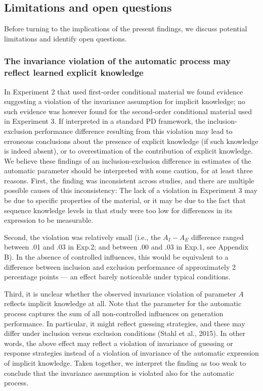 \documentclass[man]{apa6}
\theoremstyle{definition}
\theoremstyle{definition}
\theoremstyle{definition}
\theoremstyle{remark}
\begin{document}
\subsection{Limitations and open
questions}\label{limitations-and-open-questions}

Before turning to the implications of the present findings, we discuss
potential limitations and identify open questions.

\subsubsection{The invariance violation of the automatic process may
reflect learned explicit
knowledge}\label{the-invariance-violation-of-the-automatic-process-may-reflect-learned-explicit-knowledge}

In Experiment 2 that used first-order conditional material we found
evidence suggesting a violation of the invariance assumption for
implicit knowledge; no such evidence was however found for the
second-order conditional material used in Experiment 3. If interpreted
in a standard PD framework, the inclusion-exclusion performance
difference resulting from this violation may lead to erroneous
conclusions about the presence of explicit knowledge (if such knowledge
is indeed absent), or to overestimation of the contribution of explicit
knowledge. We believe these findings of an inclusion-exclusion
difference in estimates of the automatic parameter should be interpreted
with some caution, for at least three reasons. First, the finding was
inconsistent across studies, and there are multiple possible causes of
this inconsistency: The lack of a violation in Experiment 3 may be due
to specific properties of the material, or it may be due to the fact
that sequence knowledge levels in that study were too low for
differences in its expression to be measurable.

Second, the violation was relatively small (i.e., the \(A_{I}-A_{E}\)
difference ranged between .01 and .03 in Exp.2; and between .00 and .03
in Exp.1, see Appendix B). In the absence of controlled influences, this
would be equivalent to a difference between inclusion and exclusion
performance of approximately 2 percentage points --- an effect barely
noticeable under typical conditions.

Third, it is unclear whether the observed invariance violation of
parameter \(A\) reflects implicit knowledge at all. Note that the
parameter for the automatic process captures the sum of all
non-controlled influences on generation performance. In particular, it
might reflect guessing strategies, and these may differ under inclusion
versus exclusion conditions (Stahl et al., 2015). In other words, the
above effect may reflect a violation of invariance of guessing or
response strategies instead of a violation of invariance of the
automatic expression of implicit knowledge. Taken together, we interpret
the finding as too weak to conclude that the invariance assumption is
violated also for the automatic process.
\end{document}
